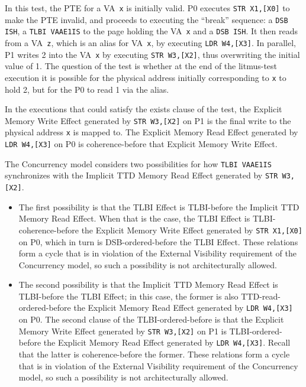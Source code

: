 \documentclass{book}
\begin{document}
In this test, the PTE for a VA~\texttt{x} is initially valid. P0 executes
\texttt{STR X1,[X0]} to make the PTE invalid, and proceeds to executing the
``break'' sequence: a \texttt{DSB ISH}, a \texttt{TLBI VAAE1IS} to the page
holding the VA~\texttt{x} and a \texttt{DSB ISH}. It then reads from a
VA~\texttt{z}, which is an alias for VA~\texttt{x}, by executing \texttt{LDR
W4,[X3]}. In parallel, P1 writes 2 into the VA~\texttt{x} by executing
\texttt{STR W3,[X2]}, thus overwriting the initial value of 1.
%
The question of the test is whether at the end of the litmus-test execution it
is possible for the physical address initially corresponding to \texttt{x} to
hold 2, but for the P0 to read 1 via the alias.

In the executions that could satisfy the exists clause of the test, the Explicit
Memory Write Effect generated by \texttt{STR W3,[X2]} on P1 is the final write
to the physical address \texttt{x} is mapped to. The Explicit Memory Read Effect
generated by \texttt{LDR W4,[X3]} on P0 is coherence-before that Explicit
Memory Write Effect.

The Concurrency model considers two possibilities for how \texttt{TLBI VAAE1IS}
synchronizes with the Implicit TTD Memory Read Effect generated by \texttt{STR
W3,[X2]}.
\begin{itemize}
\item The first possibility is that the TLBI Effect is TLBI-before the Implicit
TTD Memory Read Effect. When that is the case, the TLBI Effect is
TLBI-coherence-before the Explicit Memory Write Effect generated by \texttt{STR
X1,[X0]} on P0, which in turn is DSB-ordered-before the TLBI Effect. These
relations form a cycle that is in violation of the External Visibility
requirement of the Concurrency model, so such a possibility is not
architecturally allowed.
\item The second possibility is that the Implicit TTD Memory Read Effect is
TLBI-before the TLBI Effect; in this case, the former is also
TTD-read-ordered-before the Explicit Memory Read Effect generated by
\texttt{LDR W4,[X3]} on P0. The second clause of the TLBI-ordered-before is
that the Explicit Memory Write Effect generated by \texttt{STR W3,[X2]} on P1 is
TLBI-ordered-before the Explicit Memory Read Effect generated by \texttt{LDR
W4,[X3]}. Recall that the latter is coherence-before the former. These
relations form a cycle that is in violation of the External Visibility
requirement of the Concurrency model, so such a possibility is not
architecturally allowed.
\end{itemize}
\end{document}
